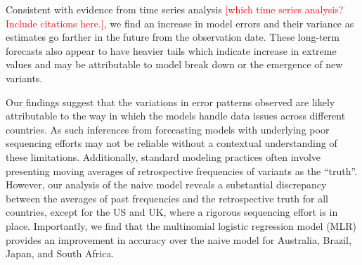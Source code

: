 \documentclass[11pt,oneside,letterpaper]{article}
\def\jhc#1{\textcolor{red}{[#1]}}
\begin{document}
Consistent with evidence from time series analysis \jhc{which time series analysis? Include citations here.}, we find an increase in model errors and their variance as estimates go farther in the future from the observation date.
These long-term forecasts also appear to have heavier tails which indicate increase in extreme values and may be attributable to model break down or the emergence of new variants.

%



Our findings suggest that the variations in error patterns observed are likely attributable to the way in which the models handle data issues across different countries.
As such inferences from forecasting models with underlying poor sequencing efforts may not be reliable without a contextual understanding of these limitations.
Additionally, standard modeling practices often involve presenting moving averages of retrospective frequencies of variants as the ``truth''.
However, our analysis of the naive model reveals a substantial discrepancy between the averages of past frequencies and the retrospective truth for all countries, except for the US and UK, where a rigorous sequencing effort is in place.
Importantly, we find that the multinomial logistic regression model (MLR) provides an improvement in accuracy over the naive model for Australia, Brazil, Japan, and South Africa.

\end{document}
